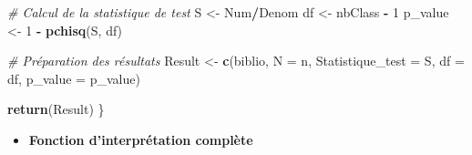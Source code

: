 \documentclass[
  12pt,
]{article}
\newenvironment{Shaded}{\begin{snugshade}}{\end{snugshade}}
\newcommand{\AttributeTok}[1]{\textcolor[rgb]{0.13,0.29,0.53}{#1}}
\newcommand{\CommentTok}[1]{\textcolor[rgb]{0.56,0.35,0.01}{\textit{#1}}}
\newcommand{\DecValTok}[1]{\textcolor[rgb]{0.00,0.00,0.81}{#1}}
\newcommand{\FunctionTok}[1]{\textcolor[rgb]{0.13,0.29,0.53}{\textbf{#1}}}
\newcommand{\NormalTok}[1]{#1}
\newcommand{\OtherTok}[1]{\textcolor[rgb]{0.56,0.35,0.01}{#1}}
\newcommand{\SpecialCharTok}[1]{\textcolor[rgb]{0.81,0.36,0.00}{\textbf{#1}}}
\providecommand{\tightlist}{%
  \setlength{\itemsep}{0pt}\setlength{\parskip}{0pt}}
\begin{document}
\begin{Shaded}
\begin{Highlighting}[]
  \CommentTok{\# Calcul de la statistique de test}
\NormalTok{  S }\OtherTok{\textless{}{-}}\NormalTok{ Num}\SpecialCharTok{/}\NormalTok{Denom}
\NormalTok{  df }\OtherTok{\textless{}{-}}\NormalTok{ nbClass }\SpecialCharTok{{-}} \DecValTok{1}
\NormalTok{  p\_value }\OtherTok{\textless{}{-}} \DecValTok{1} \SpecialCharTok{{-}} \FunctionTok{pchisq}\NormalTok{(S, df)}
  
  \CommentTok{\# Préparation des résultats}
\NormalTok{  Result }\OtherTok{\textless{}{-}} \FunctionTok{c}\NormalTok{(biblio, }\AttributeTok{N =}\NormalTok{ n, }\AttributeTok{Statistique\_test =}\NormalTok{ S, }\AttributeTok{df =}\NormalTok{ df, }\AttributeTok{p\_value =}\NormalTok{ p\_value)}
  
  \FunctionTok{return}\NormalTok{(Result)}
\NormalTok{\}}
\end{Highlighting}
\end{Shaded}

\begin{itemize}
\tightlist
\item
  \textbf{Fonction d'interprétation complète}
\end{itemize}
\end{document}
